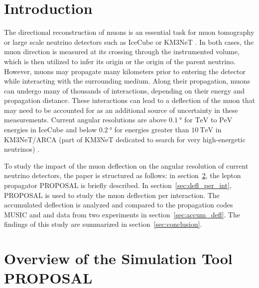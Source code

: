 \section{Introduction}\label{sec:introduction}

The directional reconstruction of muons is an essential task for muon tomography or large scale neutrino detectors such as IceCube 
\cite{IceCube_Instrumentation} or KM3NeT \cite{KM3NeT_Design}. In both cases, the muon direction is measured at its crossing through the instrumented volume, which is then utilized to infer its origin or the origin of the parent neutrino. 
However, muons may propagate many kilometers prior to entering the detector while interacting with the surrounding medium. 
Along their propagation, muons can undergo many of thousands 
of interactions, depending on their energy and propagation distance. 
These interactions can lead to a deflection of the muon that may need to be accounted for as an additional source of uncertainty in these measurements. 
Current angular resolutions are above
$\SI{0.1}{\degree}$ for  
$\si{\tera\electronvolt}$ to $\si{\peta\electronvolt}$ energies in IceCube 
\cite{IceCube_Resolution2021} 
and below 
$\SI{0.2}{\degree}$ for energies greater than $\SI{10}{\tera\electronvolt}$ in 
KM3NeT/ARCA (part of KM3NeT dedicated to search for very high-energetic neutrinos) \cite{KM3NeT_Resolution2021}.

To study the impact of the muon deflection on the angular resolution 
of current neutrino detectors, 
the paper is structured as follows: in section~\ref{sec:proposal},
the lepton propagator PROPOSAL is briefly described. In section~\ref{sec:defl_per_int},
PROPOSAL \cite{koehne2013proposal, dunsch_2018_proposal_improvements} is used to study the muon deflection per interaction.
The accumulated deflection is analyzed and compared to the propagation codes
MUSIC  and   and data from two experiments in section~\ref{sec:accum_defl}. The findings of this study
are summarized in section~\ref{sec:conclusion}.

\section{Overview of the Simulation Tool PROPOSAL}\label{sec:proposal}

